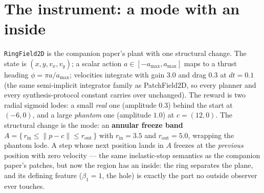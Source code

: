 \documentclass[11pt]{article}
\theoremstyle{remark}
\begin{document}
\section{The instrument: a mode with an inside}
\label{sec:instrument}

\texttt{RingField2D} is the companion paper's plant with one structural
change. The state is $(x, y, v_x, v_y)$; a scalar action
$a \in [-a_{\max}, a_{\max}]$ maps to a thrust heading
$\phi = \pi a / a_{\max}$; velocities integrate with gain $3.0$ and drag
$0.3$ at $dt = 0.1$ (the same semi-implicit integrator family as
PatchField2D, so every planner and every synthesis-protocol constant carries
over unchanged). The reward is two radial sigmoid lodes: a small
\emph{real} one (amplitude $0.3$) behind the start at $(-6, 0)$, and a
large \emph{phantom} one (amplitude $1.0$) at $c = (12, 0)$. The structural
change is the mode: an \textbf{annular freeze band}
$A = \{\, r_{\mathrm{in}} \le \lVert p - c \rVert \le
r_{\mathrm{out}} \,\}$ with $r_{\mathrm{in}} = 3.5$ and
$r_{\mathrm{out}} = 5.0$, wrapping the phantom lode. A step whose next
position lands in $A$ freezes at the \emph{previous} position with zero
velocity --- the same inelastic-stop semantics as the companion paper's
patches, but now the region has an inside: the ring separates the plane, and
its defining feature ($\beta_1 = 1$, the hole) is exactly the part no
outside observer ever touches.
\end{document}
